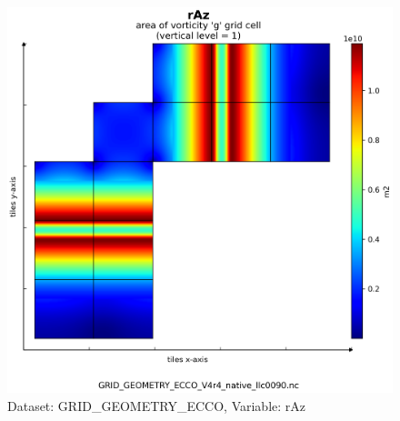 \begin{figure}[H]
\centering
\includegraphics[scale=0.55]{../images/plots/v4r4/native_plots_coords/Geometry_Parameters_for_the_Lat-Lon-Cap_90_(llc90)_Native_Model_Grid_(Version_4_Release_4)/rAz.png}
\caption{Dataset: GRID\_GEOMETRY\_ECCO, Variable: rAz}
\label{tab:table-GRID_GEOMETRY_ECCO_rAz-Plot}
\end{figure}
\newpage
\pagebreak
